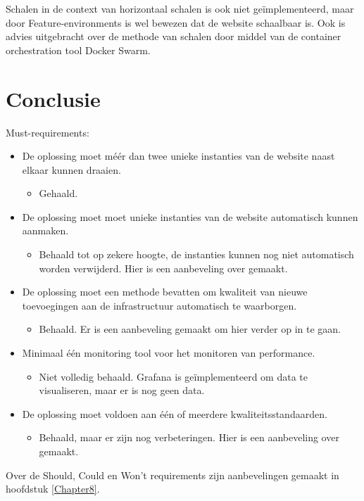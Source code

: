 Schalen in de context van horizontaal schalen is ook niet geïmplementeerd, maar door Feature-environments is wel bewezen dat de website schaalbaar is. Ook is advies uitgebracht over de methode van schalen door middel van de container orchestration tool Docker Swarm.

\section{Conclusie}

Must-requirements:
\begin{itemize}
	\item De oplossing moet méér dan twee unieke instanties van de website naast elkaar kunnen draaien.
    \begin{itemize}
        \item Gehaald.
    \end{itemize}

	\item De oplossing moet moet unieke instanties van de website automatisch kunnen aanmaken.
    \begin{itemize}
        \item Behaald tot op zekere hoogte, de instanties kunnen nog niet automatisch worden verwijderd. Hier is een aanbeveling over gemaakt.
    \end{itemize}

	\item De oplossing moet een methode bevatten om kwaliteit van nieuwe toevoegingen aan de infrastructuur automatisch te waarborgen.
    \begin{itemize}
        \item Behaald. Er is een aanbeveling gemaakt om hier verder op in te gaan.
    \end{itemize}

	\item Minimaal één monitoring tool voor het monitoren van performance.
    \begin{itemize}
        \item Niet volledig behaald. Grafana is geïmplementeerd om data te visualiseren, maar er is nog geen data. 
    \end{itemize}

	\item De oplossing moet voldoen aan één of meerdere kwaliteitsstandaarden.
    \begin{itemize}
        \item Behaald, maar er zijn nog verbeteringen. Hier is een aanbeveling over gemaakt.
    \end{itemize}
\end{itemize}

Over de Should, Could en Won't requirements zijn aanbevelingen gemaakt in hoofdstuk \ref{Chapter8}.
